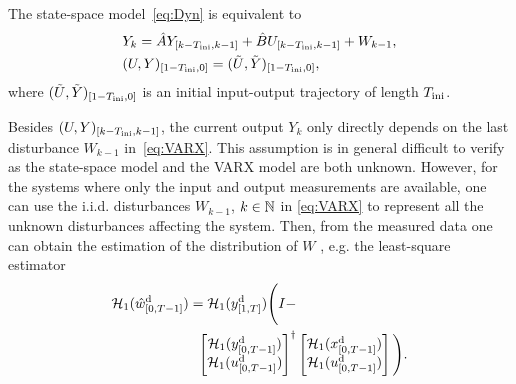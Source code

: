 \begin{assum} \label{ass:VARX}
	The state-space model~\eqref{eq:Dyn} is equivalent to
	\begin{subequations} \label{eq:VARX}
		\begin{align}
			&Y_k = \hat{A}Y_{[k-T_\text{ini},k-1]} + \hat{B}U_{[k-T_\text{ini},k-1]} + W_{k-1},\\
			&(U,Y)_{[1-T_\text{ini},0]} = (\tilde{U},\tilde{Y})_{[1-T_\text{ini},0]},
		\end{align}
	\end{subequations}
	where $(\tilde{U},\tilde{Y})_{[1-T_\text{ini},0]}$ is an initial input-output trajectory of length $T_\text{ini}$.
\end{assum}
\begin{rem} \label{rem:VARX}
	Besides $(U,Y)_{[k-T_\text{ini},k-1]}$, the current output $Y_k$ only directly depends on the last disturbance $W_{k-1}$ in~\eqref{eq:VARX}. This assumption is in general difficult to verify as the state-space model and the VARX model are both unknown.
    However, for the systems where only the input and output measurements are available, one can use the i.i.d. disturbances $W_{k-1}$, $k\in\mathbb{N}$ in \eqref{eq:VARX} to represent all the unknown disturbances affecting the system. Then, from the measured data one can obtain the estimation of the distribution of $W$ \citep{pan23stochastic, turan22data}, e.g. the least-square estimator
    \begin{equation} \label{eq:Estimator}
    	\begin{split}
	    	\mathcal{H}_1(\hat{w}_{[0,T-1]}^{\mathrm{d}}) = \mathcal{H}_1(y_{[1,T]}^{\mathrm{d}})\Bigg(I-&\\
    		\begin{bmatrix} \mathcal{H}_1(y_{[0,T-1]}^{\mathrm{d}}) \\ \mathcal{H}_1(u_{[0,T-1]}^{\mathrm{d}}) \end{bmatrix}^\dagger
    		&\begin{bmatrix} \mathcal{H}_1(x_{[0,T-1]}^{\mathrm{d}}) \\ \mathcal{H}_1(u_{[0,T-1]}^{\mathrm{d}}) \end{bmatrix}\Bigg).
    	\end{split}
    \end{equation}
\end{rem}

